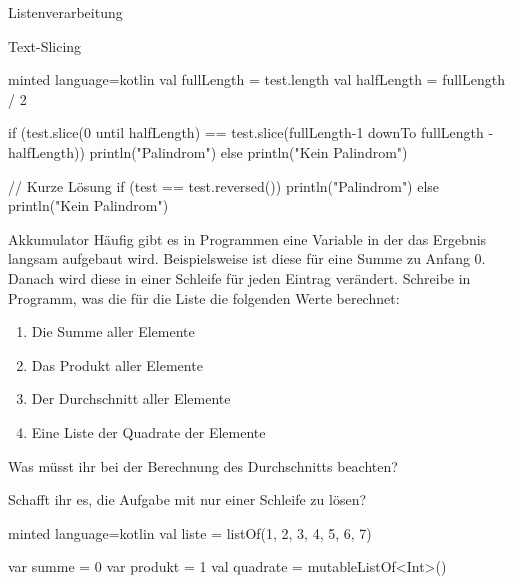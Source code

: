 \begin{task}[points=auto]{Listenverarbeitung}
\begin{subtask*}[points=0]{Text-Slicing }
\begin{solution}
\begin{codeBlock}[]{minted language=kotlin}
                val fullLength = test.length
                val halfLength = fullLength / 2

                if (test.slice(0 until halfLength) == test.slice(fullLength-1 downTo fullLength - halfLength)) {
                    println("Palindrom")
                } else {
                    println("Kein Palindrom")
                }

                // Kurze Lösung
                if (test == test.reversed()) {
                    println("Palindrom")
                } else {
                    println("Kein Palindrom")
                }
            \end{codeBlock}
        \end{solution}
    \end{subtask*}
    \begin{subtask*}[points=0]{Akkumulator }
        Häufig gibt es in Programmen eine Variable in der das Ergebnis langsam aufgebaut
        wird. Beispielsweise ist diese für eine Summe zu Anfang $0$. Danach wird diese
        in einer Schleife für jeden Eintrag verändert. Schreibe in Programm, was die
        für die Liste \kotlininline{[1, 2, 3, 4, 5, 6, 7]} die folgenden Werte berechnet:

        \begin{enumerate}
            \item Die Summe aller Elemente
            \item Das Produkt aller Elemente
            \item Der Durchschnitt aller Elemente
            \item Eine Liste der Quadrate der Elemente
        \end{enumerate}

        Was müsst ihr bei der Berechnung des Durchschnitts beachten?

        \begin{infoBox}

            Schafft ihr es, die Aufgabe mit nur einer Schleife zu lösen?
        \end{infoBox}

        \begin{solution}
            \begin{codeBlock}[]{minted language=kotlin}
                val liste = listOf(1, 2, 3, 4, 5, 6, 7)

                var summe = 0
                var produkt = 1
                val quadrate = mutableListOf<Int>()


\end{codeBlock}
\end{solution}
\end{subtask*}
\end{task}
